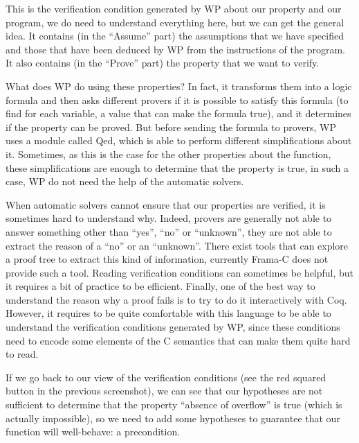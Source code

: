 

This is the verification condition generated by WP about our property and our
program, we do need to understand everything here, but we can get the
general idea. It contains (in the ``Assume'' part) the assumptions that
we have specified and those that have been deduced by WP from the
instructions of the program. It also contains (in the ``Prove'' part)
the property that we want to verify.



What does WP do using these properties? In fact, it transforms them
into a logic formula and then asks different provers if it is
possible to satisfy this formula (to find for each variable, a value
that can make the formula true), and it determines if the property can
be proved. But before sending the formula to provers, WP uses a module
called Qed, which is able to perform different simplifications about it.
Sometimes, as this is the case for the other properties about the
 function, these simplifications are enough to determine that
the property is true, in such a case, WP do not need the help of the
automatic solvers.



When automatic solvers cannot ensure that our properties are verified,
it is sometimes hard to understand why. Indeed, provers are generally
not able to answer something other than ``yes'', ``no'' or ``unknown'',
they are not able to extract the reason of a ``no'' or an ``unknown''.
There exist tools that can explore a proof tree to extract this kind of
information, currently Frama-C does not provide such a tool. Reading
verification conditions can sometimes be helpful, but it requires a bit of
practice to be efficient. Finally, one of the best way to understand the reason
why a proof fails is to try to do it interactively with Coq. However, it
requires to be quite comfortable with this language to be able to understand
the verification conditions generated by WP, since these conditions
need to encode some elements of the C semantics that can make them quite
hard to read.



If we go back to our view of the verification conditions (see the red squared
button in the previous screenshot), we can see that our hypotheses are not
sufficient to determine that the property ``absence of overflow'' is true (which
is actually impossible), so we need to add some hypotheses to
guarantee that our function will well-behave: a precondition.




